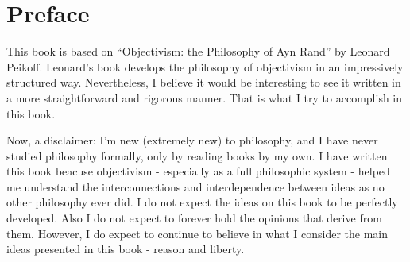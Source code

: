 \chapter*{Preface}

    This book is based on ``Objectivism: the Philosophy of Ayn Rand'' by Leonard Peikoff. Leonard's book develops the philosophy of objectivism in an impressively structured way. Nevertheless, I believe it would be interesting to see it written in a more straightforward and rigorous manner. That is what I try to accomplish in this book.

    Now, a disclaimer: I'm new (extremely new) to philosophy, and I have never studied philosophy formally, only by reading books by my own. I have written this book beacuse objectivism - especially as a full philosophic system - helped me understand the interconnections and interdependence between ideas as no other philosophy ever did. I do not expect the ideas on this book to be perfectly developed. Also I do not expect to forever hold the opinions that derive from them. However, I do expect to continue to believe in what I consider the main ideas presented in this book - reason and liberty.